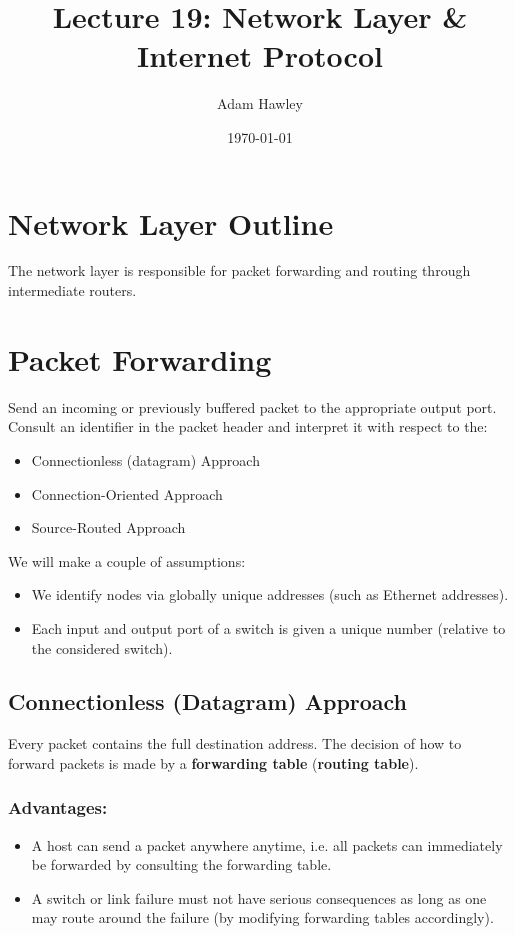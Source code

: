\documentclass[11pt]{article}
\author{Adam Hawley}
\date{\today}
\title{Lecture 19: Network Layer \& Internet Protocol}
\begin{document}
\maketitle
\tableofcontents


\section{Network Layer Outline}
\label{sec:org7bc5dd6}
The network layer is responsible for packet forwarding and routing through intermediate routers.

\section{Packet Forwarding}
\label{sec:org8fb40f2}
Send an incoming or previously buffered packet to the appropriate output port.
Consult an identifier in the packet header and interpret it with respect to the:
\begin{itemize}
\item Connectionless (datagram) Approach
\item Connection-Oriented Approach
\item Source-Routed Approach
\end{itemize}
We will make a couple of assumptions:
\begin{itemize}
\item We identify nodes via globally unique addresses (such as Ethernet addresses).
\item Each input and output port of a switch is given a unique number (relative to the considered switch).
\end{itemize}

\subsection{Connectionless (Datagram) Approach}
\label{sec:org5f9c020}
Every packet contains the full destination address.
The decision of how to forward packets is made by a \textbf{forwarding table} (\textbf{routing table}).
\subsubsection{Advantages:}
\label{sec:org00c1d97}
\begin{itemize}
\item A host can send a packet anywhere anytime, i.e. all packets can immediately be forwarded by consulting the forwarding table.
\item A switch or link failure must not have serious consequences as long as one may route around the failure (by modifying forwarding tables accordingly).
\end{itemize}
\end{document}
